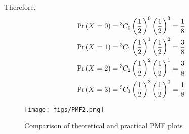 \documentclass[journal,12pt,twocolumn]{IEEEtran}
\begin{document}
Therefore,
\begin{align}
    \Pr\left(X = 0\right) &= {{}^{3}\mkern-1muC_{0}}\left(\frac{1}{2}\right)^0\left(\frac{1}{2}\right)^3 = \frac{1}{8}\\
    \Pr\left(X = 1\right) &= {{}^{3}\mkern-1muC_{1}}\left(\frac{1}{2}\right)^1\left(\frac{1}{2}\right)^2 = \frac{3}{8}\\
    \Pr\left(X = 2\right) &= {{}^{3}\mkern-1muC_{2}}\left(\frac{1}{2}\right)^2\left(\frac{1}{2}\right)^1 = \frac{3}{8}\\
    \Pr\left(X = 3\right) &= {{}^{3}\mkern-1muC_{3}}\left(\frac{1}{2}\right)^3\left(\frac{1}{2}\right)^0 = \frac{1}{8}
\end{align} 
\begin{figure}[!ht]
    \centering
    \texttt{[image: figs/PMF2.png]}
    \caption{Comparison of theoretical and practical PMF plots}
\end{figure}
\end{document}
